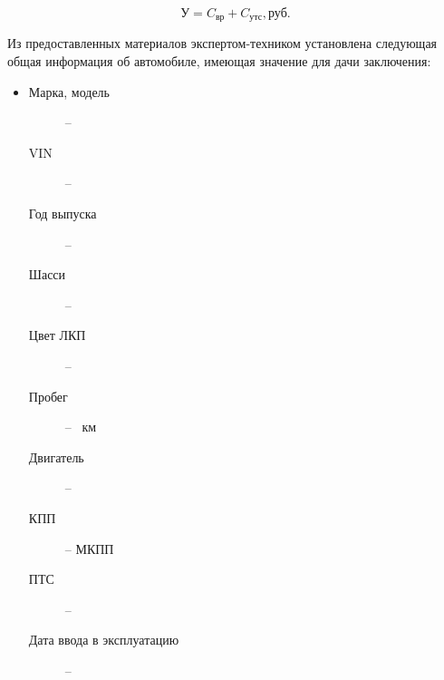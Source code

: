 \begin{equation}\label{1121}
 \text{У} = C_\text{вр} + C_\text{утс},    \text{руб.}
\end{equation}



 \par Из предоставленных материалов   экспертом-техником установлена следующая общая информация об автомобиле, имеющая значение для дачи заключения:\\
 \parbox[]{10cm}{}
	\begin{itemize}
		\item[ ] 
			\begin{description}
			\item[Марка, модель] -- 
			\item[VIN] -- \vin
			\item[Год выпуска] -- 
			\item[Шасси] -- 
			\item[Цвет ЛКП] -- 
			\item[Пробег] --  \, км%
			\item[Двигатель] -- 
			\item[КПП] -- МКПП
	    	\item[ПТС] --	
	    	\item[Дата ввода в эксплуатацию] --
		\end{description}
		\end{itemize}
	


